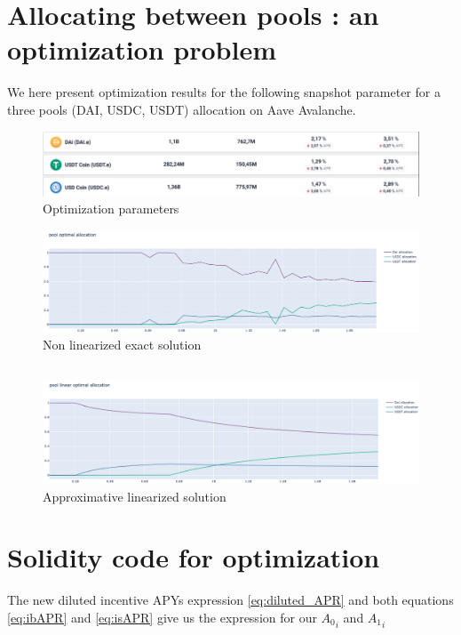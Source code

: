 \documentclass[conference]{IEEEtran}
\begin{document}
\section{Allocating between pools : an optimization problem}
We here present optimization results for the following snapshot parameter for a three pools (DAI, USDC, USDT) allocation on Aave Avalanche.
\begin{figure}[h!]
    \centering
    \includegraphics[scale=0.25]{Plots/optim_params.png}
    \caption{Optimization parameters}
    \label{fig:optim_params}
\end{figure}
\begin{figure}[h!]
    \centering
    \includegraphics[scale=0.19]{Plots/nonlinear.png}
    \caption{Non linearized exact solution}
    \label{fig:nonlinear}
\end{figure}
\subsection{}
\begin{figure}[h!]
    \centering
    \includegraphics[scale=0.19]{Plots/linearized_quadratic.png}
    \caption{Approximative linearized solution}
    \label{fig:linearized_quadratic}
\end{figure}

\section{Solidity code for optimization}
The new diluted incentive APYs expression \ref{eq:diluted_APR} and both equations \ref{eq:ibAPR} and \ref{eq:isAPR} give us the expression for our ${A_0}_i$ and ${A_1}_i$
\end{document}
